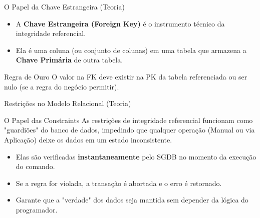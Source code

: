\documentclass[9pt]{beamer}
\begin{document}
\begin{frame}{O Papel da Chave Estrangeira (Teoria)}
  \begin{itemize}
    \item A \textbf{Chave Estrangeira (Foreign Key)} é o instrumento técnico da integridade referencial.
    \item Ela é uma coluna (ou conjunto de colunas) em uma tabela que armazena a \textbf{Chave Primária} de outra tabela.
  \end{itemize}
  \vspace{0.3cm}
  \centering
  \vspace{0.3cm}
  \begin{alertblock}{Regra de Ouro}
    O valor na FK deve existir na PK da tabela referenciada ou ser nulo (se a regra do negócio permitir).
  \end{alertblock}
\end{frame}

\begin{frame}{Restrições no Modelo Relacional (Teoria)}
  \begin{block}{O Papel das Constraints}
    As restrições de integridade referencial funcionam como "guardiões" do banco de dados, impedindo que qualquer operação (Manual ou via Aplicação) deixe os dados em um estado inconsistente.
  \end{block}
  \vspace{0.4cm}
  \begin{itemize}
    \item Elas são verificadas \textbf{instantaneamente} pelo SGDB no momento da execução do comando.
    \item Se a regra for violada, a transação é abortada e o erro é retornado.
    \item Garante que a "verdade" dos dados seja mantida sem depender da lógica do programador.
  \end{itemize}
\end{frame}
\end{document}
